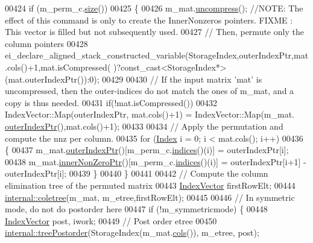 \begin{DoxyCode}
00424   \textcolor{keywordflow}{if} (m\_perm\_c.\hyperlink{group___core___module_a2216f9ce7b453ac39c46ff0323daeac9}{size}())
00425   \{
00426     m\_mat.\hyperlink{group___sparse_core___module_a7e560ebda035e992d2c99875cc7c3af3}{uncompress}(); \textcolor{comment}{//NOTE: The effect of this command is only to create the InnerNonzeros
       pointers. FIXME : This vector is filled but not subsequently used.  }
00427     \textcolor{comment}{// Then, permute only the column pointers}
00428     ei\_declare\_aligned\_stack\_constructed\_variable(StorageIndex,outerIndexPtr,mat.cols()+1,mat.isCompressed(
      )?\textcolor{keyword}{const\_cast<}StorageIndex*\textcolor{keyword}{>}(mat.outerIndexPtr()):0);
00429     
00430     \textcolor{comment}{// If the input matrix 'mat' is uncompressed, then the outer-indices do not match the ones of m\_mat,
       and a copy is thus needed.}
00431     \textcolor{keywordflow}{if}(!mat.isCompressed()) 
00432       IndexVector::Map(outerIndexPtr, mat.cols()+1) = IndexVector::Map(m\_mat.
      \hyperlink{group___sparse_core___module_a75506964d86d6badb32d0b4917acf2e2}{outerIndexPtr}(),mat.cols()+1);
00433     
00434     \textcolor{comment}{// Apply the permutation and compute the nnz per column.}
00435     \textcolor{keywordflow}{for} (\hyperlink{namespace_eigen_a62e77e0933482dafde8fe197d9a2cfde}{Index} i = 0; i < mat.cols(); i++)
00436     \{
00437       m\_mat.\hyperlink{group___sparse_core___module_a75506964d86d6badb32d0b4917acf2e2}{outerIndexPtr}()[m\_perm\_c.\hyperlink{group___core___module_a2f1ab379207fcd1ceb33941e25cf50c2}{indices}()(i)] = outerIndexPtr[i];
00438       m\_mat.\hyperlink{group___sparse_core___module_a218204b051a24f579c394454786eeda0}{innerNonZeroPtr}()[m\_perm\_c.\hyperlink{group___core___module_a2f1ab379207fcd1ceb33941e25cf50c2}{indices}()(i)] = outerIndexPtr[i+1] - 
      outerIndexPtr[i];
00439     \}
00440   \}
00441   
00442   \textcolor{comment}{// Compute the column elimination tree of the permuted matrix }
00443   \hyperlink{group___core___module}{IndexVector} firstRowElt;
00444   \hyperlink{namespace_eigen_1_1internal_a86181db74ba596a7afbfd89efcc5788c}{internal::coletree}(m\_mat, m\_etree,firstRowElt); 
00445      
00446   \textcolor{comment}{// In symmetric mode, do not do postorder here}
00447   \textcolor{keywordflow}{if} (!m\_symmetricmode) \{
00448     \hyperlink{group___core___module}{IndexVector} post, iwork; 
00449     \textcolor{comment}{// Post order etree}
00450     \hyperlink{namespace_eigen_1_1internal_ab414b5990bd6c865958a9231ff418d20}{internal::treePostorder}(StorageIndex(m\_mat.\hyperlink{group___sparse_core___module_aa391750e3c530227e4a5c3c52e959975}{cols}()), m\_etree, post); 

\end{DoxyCode}
